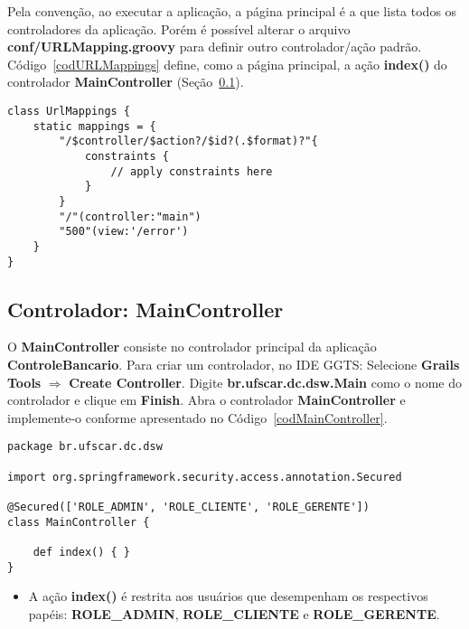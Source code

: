 Pela convenção, ao executar a aplicação,  a página principal é a que lista todos
os  controladores  da  aplicação.   Porém  é possível  alterar  o  arquivo  {\bf
  conf/URLMapping.groovy}      para      definir     outro      controlador/ação
padrão. Código~\ref{codURLMappings} define, como a página principal, a ação {\bf
  index()} do controlador {\bf MainController} (Seção~\ref{secMainController}).  

\begin{lstlisting}[caption={\bf   URLMappings.groovy},  frame=trBL,  float=htbp,
    label=codURLMappings] 
class UrlMappings {
	static mappings = {
        "/$controller/$action?/$id?(.$format)?"{
            constraints {
                // apply constraints here
            }
        }
        "/"(controller:"main")
        "500"(view:'/error')
	}
}
\end{lstlisting}

\newpage

\subsection{Controlador: MainController}\label{secMainController}

\vspace{0.5cm}

O  {\bf MainController}  consiste  no controlador  principal  da aplicação  {\bf
  ControleBancario}.   Para criar um  controlador, no  IDE GGTS:  Selecione {\bf
  Grails  Tools}   $\Longrightarrow$  {\bf  Create   Controller}.   Digite  {\bf
  br.ufscar.dc.dsw.Main} como  o nome do  controlador e clique em  {\bf Finish}.
Abra o  controlador {\bf MainController} e implemente-o  conforme apresentado no
Código~\ref{codMainController}.  

\begin{lstlisting}[caption=Controlador    {\bf    MainController},   frame=trBL,
    float=htbp, label=codMainController] 
package br.ufscar.dc.dsw

import org.springframework.security.access.annotation.Secured

@Secured(['ROLE_ADMIN', 'ROLE_CLIENTE', 'ROLE_GERENTE'])
class MainController {

    def index() { }
}
\end{lstlisting}

\begin{itemize}

\item  A  ação  {\bf  index()}  é  restrita  aos  usuários  que  desempenham  os
  respectivos   papéis:   {\bf   ROLE\_ADMIN},   {\bf  ROLE\_CLIENTE}   e   {\bf
    ROLE\_GERENTE}.  

\end{itemize}

